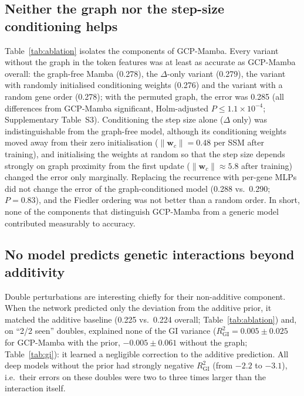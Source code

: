 \documentclass{bioinfo}
\begin{document}


\subsection{Neither the graph nor the step-size conditioning helps}
Table~\ref{tab:ablation} isolates the components of GCP-Mamba. Every variant without the graph in
the token features was at least as accurate as GCP-Mamba overall: the graph-free Mamba (0.278),
the $\Delta$-only variant (0.279), the variant with randomly initialised conditioning weights
(0.276) and the variant with a random gene order (0.278); with the permuted graph, the error was
0.285 (all differences from GCP-Mamba significant, Holm-adjusted $P\leq1.1\times10^{-4}$;
Supplementary Table~S3). Conditioning the step size alone ($\Delta$ only) was indistinguishable from
the graph-free model, although its conditioning weights moved away from their zero initialisation
($\|\mathbf{w}_c\|=0.48$ per SSM after training), and initialising the weights at random so that the
step size depends strongly on graph proximity from the first update ($\|\mathbf{w}_c\|\approx5.8$
after training) changed the error only marginally. Replacing the recurrence with per-gene MLPs did
not change the error of the graph-conditioned model (0.288 vs.\ 0.290; $P=0.83$), and the Fiedler
ordering was not better than a random order. In short, none of the components that distinguish
GCP-Mamba from a generic model contributed measurably to accuracy.

\subsection{No model predicts genetic interactions beyond additivity}
Double perturbations are interesting chiefly for their non-additive component. When the network
predicted only the deviation from the additive prior, it matched the additive baseline (0.225 vs.\
0.224 overall; Table~\ref{tab:ablation}) and, on ``2/2 seen'' doubles, explained none of the GI
variance ($R^2_{\mathrm{GI}}=0.005\pm0.025$ for GCP-Mamba with the prior, $-0.005\pm0.061$ without the
graph; Table~\ref{tab:gi}): it learned a negligible correction to the additive prediction. All deep models
without the prior had strongly negative $R^2_{\mathrm{GI}}$ (from $-2.2$ to $-3.1$), i.e.\ their errors
on these doubles were two to three times larger than the interaction itself.
\end{document}
